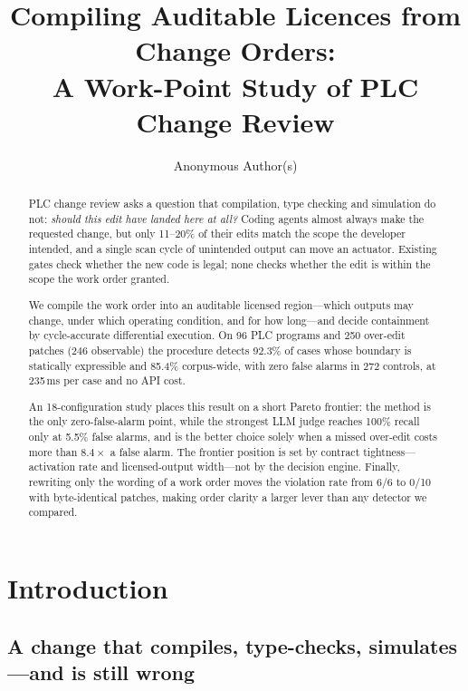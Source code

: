 \documentclass[acmsmall,screen,review,anonymous]{acmart}
\begin{document}
\title{Compiling Auditable Licences from Change Orders:\\
A Work-Point Study of PLC Change Review}

\author{Anonymous Author(s)}

\begin{abstract}
PLC change review asks a question that compilation, type checking and simulation do not: \emph{should this edit have landed here at all?} Coding agents almost always make the requested change, but only 11--20\% of their edits match the scope the developer intended, and a single scan cycle of unintended output can move an actuator. Existing gates check whether the new code is legal; none checks whether the edit is within the scope the work order granted.

We compile the work order into an auditable licensed region---which outputs may change, under which operating condition, and for how long---and decide containment by cycle-accurate differential execution. On 96 PLC programs and 250 over-edit patches (246 observable) the procedure detects 92.3\% of cases whose boundary is statically expressible and 85.4\% corpus-wide, with zero false alarms in 272 controls, at 235\,ms per case and no API cost.

An 18-configuration study places this result on a short Pareto frontier: the method is the only zero-false-alarm point, while the strongest LLM judge reaches 100\% recall only at 5.5\% false alarms, and is the better choice solely when a missed over-edit costs more than $8.4\times$ a false alarm. The frontier position is set by contract tightness---activation rate and licensed-output width---not by the decision engine. Finally, rewriting only the wording of a work order moves the violation rate from 6/6 to 0/10 with byte-identical patches, making order clarity a larger lever than any detector we compared.
\end{abstract}

\maketitle

\section{Introduction}

\subsection{A change that compiles, type-checks, simulates---and is still wrong}
\end{document}
